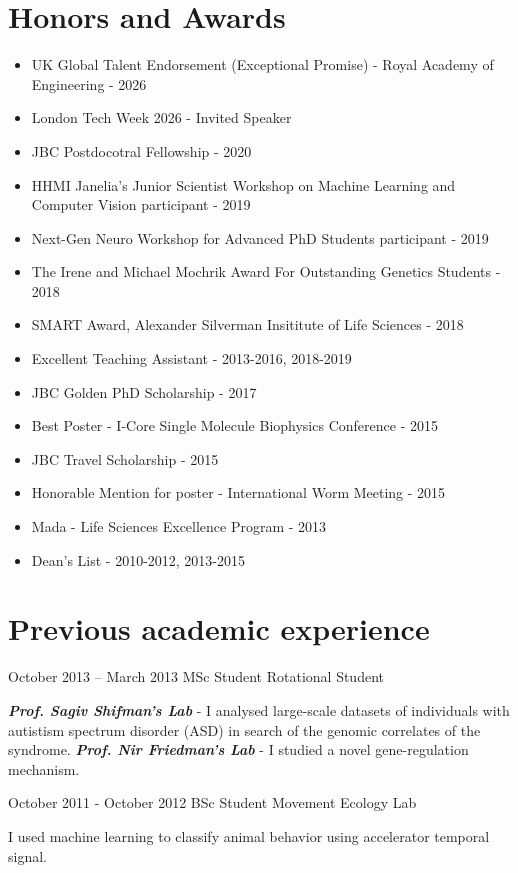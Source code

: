 \documentclass{tccv_Eyal}
\begin{document}
\section{Honors and Awards}
\begin{itemize}
\item
UK Global Talent Endorsement (Exceptional Promise) - Royal Academy of Engineering - 2026
\item
London Tech Week 2026 - Invited Speaker
\item
JBC Postdocotral Fellowship - 2020
\item
HHMI Janelia's Junior Scientist Workshop on Machine Learning and Computer Vision participant - 2019
\item
Next-Gen Neuro Workshop for Advanced PhD Students participant - 2019
\item
The Irene and Michael Mochrik Award
For Outstanding Genetics Students - 2018
\item
SMART Award, Alexander Silverman Insititute of Life Sciences - 2018
\item
Excellent Teaching Assistant - 2013-2016, 2018-2019
\item
JBC Golden PhD Scholarship - 2017
\item
Best Poster - I-Core Single Molecule Biophysics Conference - 2015
\item
JBC Travel Scholarship - 2015
\item
Honorable Mention for poster - International Worm Meeting - 2015
\item
Mada - Life Sciences Excellence Program - 2013
\item
Dean's List - 2010-2012, 2013-2015
\end{itemize}


\section{Previous academic experience}
\begin{eventlist}
\item{October 2013 -- March 2013}
     {MSc Student}
     {Rotational Student}

\textbf{\textit{Prof. Sagiv Shifman's Lab}} - I analysed large-scale datasets of individuals with autistism spectrum disorder (ASD)  in search of the genomic correlates of the syndrome.
\newline\newline
\textbf{\textit{Prof. Nir Friedman's Lab}} - I studied a novel gene-regulation mechanism.

\item{October 2011 - October 2012}
     {BSc Student}
     {Movement Ecology Lab}

     I used machine learning to classify animal behavior using accelerator temporal signal.

%

\end{eventlist}
\end{document}
